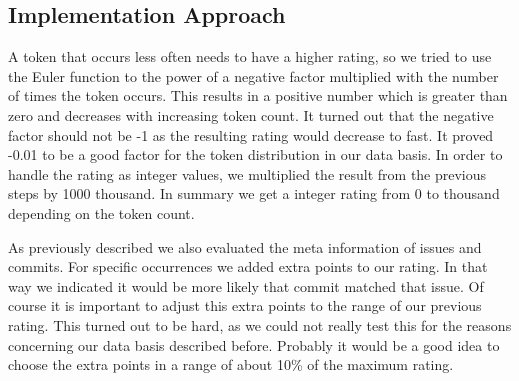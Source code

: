 \subsection{Implementation Approach}
A token that occurs less often needs to have a higher rating, so we tried to use the Euler function to the power of a negative factor multiplied with the number of times the token occurs.
This results in a positive number which is greater than zero and decreases with increasing token count.
It turned out that the negative factor should not be -1 as the resulting rating would decrease to fast.
It proved -0.01 to be a good factor for the token distribution in our data basis.
In order to handle the rating as integer values, we multiplied the result from the previous steps by 1000 thousand.
In summary we get a integer rating from 0 to thousand depending on the token count.

As previously described we also evaluated the meta information of issues and commits.
For specific occurrences we added extra points to our rating. In that way we indicated it would be more likely that commit matched that issue.
Of course it is important to adjust this extra points to the range of our previous rating.
This turned out to be hard, as we could not really test this for the reasons concerning our data basis described before.
Probably it would be a good idea to choose the extra points in a range of about 10\% of the maximum rating.
